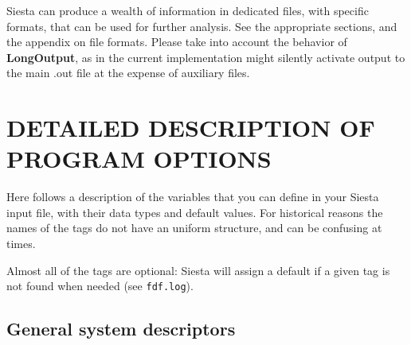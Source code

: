 \documentclass[11pt]{article}
\begin{document}
{\sc Siesta} can produce a wealth of information in dedicated files,
with specific formats, that can be used for further analysis. See the
appropriate sections, and the appendix on file formats.
Please take into account the behavior of
{\bf LongOutput}, as in the current implementation might silently
activate output to the main .out file at the expense of auxiliary
files.

\section{DETAILED DESCRIPTION OF PROGRAM OPTIONS}


Here follows a description of the variables that you can define in
your {\sc Siesta} input file, with their data types and default
values. For historical reasons the names of the tags do not have an
uniform structure, and can be confusing at times.

Almost all of the tags are optional: {\sc Siesta} will assign a
default if a given tag is not found when needed (see {\tt fdf.log}).


\vspace{5pt}
\subsection{General system descriptors}
\end{document}
